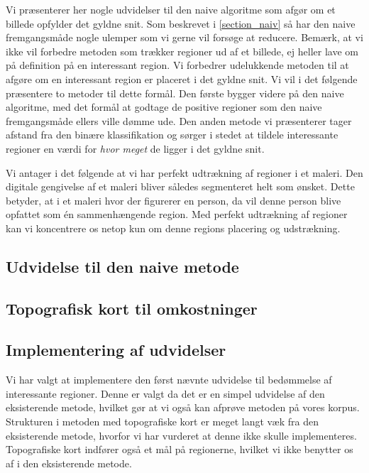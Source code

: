 {
{\sffamily Vi præsenterer her nogle udvidelser til den naive algoritme
som afgør om et billede opfylder det gyldne snit. Som beskrevet i
\ref{section_naiv} så har den naive fremgangsmåde nogle ulemper som vi
gerne vil forsøge at reducere. Bemærk, at vi ikke vil forbedre metoden
som trækker regioner ud af et billede, ej heller lave om på definition
på en interessant region. Vi forbedrer udelukkende metoden til at afgøre
om en interessant region er placeret i det gyldne snit. Vi vil i det
følgende præsentere to metoder til dette formål. Den første bygger
videre på den naive algoritme, med det formål at godtage de positive
regioner som den naive fremgangsmåde ellers ville dømme ude. Den anden
metode vi præsenterer tager afstand fra den binære klassifikation og
sørger i stedet at tildele interessante regioner en værdi for
\emph{hvor meget} de ligger i det gyldne snit.

Vi antager i det følgende at vi har perfekt udtrækning af regioner i et
maleri. Den digitale gengivelse af et maleri bliver således segmenteret
helt som ønsket. Dette betyder, at i et maleri hvor der figurerer en
person, da vil denne person blive opfattet som én sammenhængende region.
Med perfekt udtrækning af regioner kan vi koncentrere os netop kun om
denne regions placering og udstrækning.
}

\subsection{Udvidelse til den naive metode}


\subsection{Topografisk kort til omkostninger}


\subsection{Implementering af udvidelser}
Vi har valgt at implementere den først nævnte udvidelse til bedømmelse
af interessante regioner. Denne er valgt da det er en simpel udvidelse
af den eksisterende metode, hvilket gør at vi også kan afprøve metoden på
vores korpus. Strukturen i metoden med topografiske kort er meget
langt væk fra den eksisterende metode, hvorfor vi har vurderet at denne
ikke skulle implementeres. Topografiske kort indfører også et mål på
regionerne, hvilket vi ikke benytter os af i den eksisterende metode.

}


